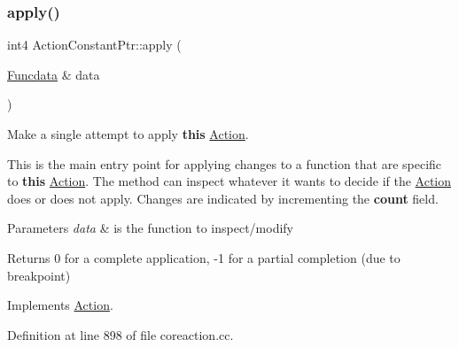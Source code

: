 \subsubsection{\texorpdfstring{apply()}{apply()}}
{\footnotesize\ttfamily int4 Action\+Constant\+Ptr\+::apply (\begin{DoxyParamCaption}\item[{\mbox{\hyperlink{class_funcdata}{Funcdata}} \&}]{data }\end{DoxyParamCaption})\hspace{0.3cm}{\ttfamily [virtual]}}



Make a single attempt to apply {\bfseries{this}} \mbox{\hyperlink{class_action}{Action}}. 

This is the main entry point for applying changes to a function that are specific to {\bfseries{this}} \mbox{\hyperlink{class_action}{Action}}. The method can inspect whatever it wants to decide if the \mbox{\hyperlink{class_action}{Action}} does or does not apply. Changes are indicated by incrementing the {\bfseries{count}} field. 
\begin{DoxyParams}{Parameters}
{\em data} & is the function to inspect/modify \\
\hline
\end{DoxyParams}
\begin{DoxyReturn}{Returns}
0 for a complete application, -\/1 for a partial completion (due to breakpoint) 
\end{DoxyReturn}


Implements \mbox{\hyperlink{class_action_aac1c3999d6c685b15f5d9765a4d04173}{Action}}.



Definition at line 898 of file coreaction.\+cc.

